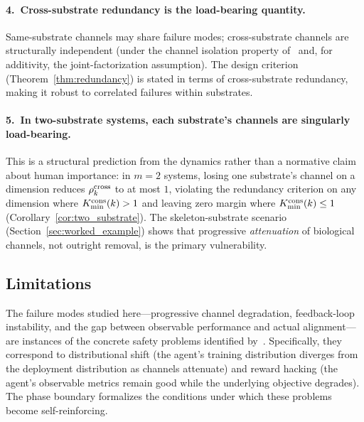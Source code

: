 \paragraph{4.\ Cross-substrate redundancy is the load-bearing quantity.}
Same-substrate channels may share failure modes; cross-substrate
channels are structurally independent (under the channel
isolation property of~\citet{lasser2026exo} and, for additivity, the joint-factorization assumption).
The design criterion (Theorem~\ref{thm:redundancy}) is stated in terms
of cross-substrate redundancy, making it robust to correlated failures
within substrates.

\paragraph{5.\ In two-substrate systems, each substrate's channels are singularly load-bearing.}
This is a structural prediction from the dynamics rather than a
normative claim about human importance: in $m = 2$ systems, losing one
substrate's channel on a dimension reduces $\rho^{\mathrm{cross}}_k$ to at most
$1$, violating the redundancy criterion on any dimension where
$K_{\mathrm{min}}^{\mathrm{cons}}(k) > 1$ and leaving zero margin where $K_{\mathrm{min}}^{\mathrm{cons}}(k) \leq 1$
(Corollary~\ref{cor:two_substrate}).
The skeleton-substrate scenario (Section~\ref{sec:worked_example})
shows that progressive \emph{attenuation} of biological channels, not
outright removal, is the primary vulnerability.

\subsection{Limitations}

The failure modes studied here---progressive channel degradation,
feedback-loop instability, and the gap between observable performance
and actual alignment---are instances of the concrete safety problems
identified by~\citet{amodei2016concrete}.  Specifically, they
correspond to distributional shift (the agent's training distribution
diverges from the deployment distribution as channels attenuate) and
reward hacking (the agent's observable metrics remain good while the
underlying objective degrades).  The phase boundary formalizes the
conditions under which these problems become self-reinforcing.

